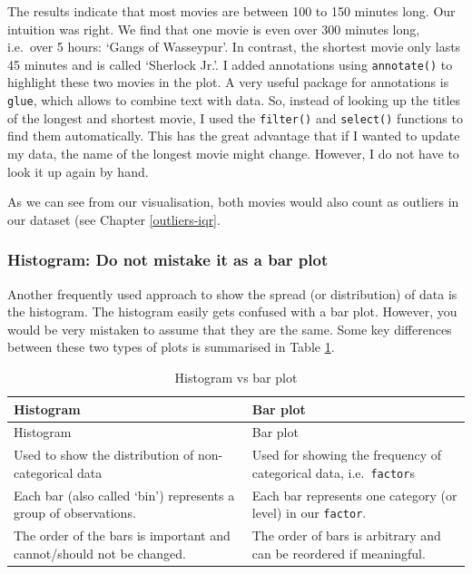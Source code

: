 \documentclass[
]{book}
\begin{document}
The results indicate that most movies are between 100 to 150 minutes long. Our intuition was right. We find that one movie is even over 300 minutes long, i.e.~over 5 hours: `Gangs of Wasseypur'. In contrast, the shortest movie only lasts 45 minutes and is called `Sherlock Jr.'. I added annotations using \texttt{annotate()} to highlight these two movies in the plot. A very useful package for annotations is \texttt{glue}, which allows to combine text with data. So, instead of looking up the titles of the longest and shortest movie, I used the \texttt{filter()} and \texttt{select()} functions to find them automatically. This has the great advantage that if I wanted to update my data, the name of the longest movie might change. However, I do not have to look it up again by hand.

As we can see from our visualisation, both movies would also count as outliers in our dataset (see Chapter \ref{outliers-iqr}.

\hypertarget{histogram-do-not-mistake-it-as-a-bar-plot}{%
\subsubsection{Histogram: Do not mistake it as a bar plot}\label{histogram-do-not-mistake-it-as-a-bar-plot}}

Another frequently used approach to show the spread (or distribution) of data is the histogram. The histogram easily gets confused with a bar plot. However, you would be very mistaken to assume that they are the same. Some key differences between these two types of plots is summarised in Table \ref{tab:histogram-vs-bar-plot}.

\begin{longtable}[]{@{}
  >{\raggedright\arraybackslash}p{}
  >{\raggedright\arraybackslash}p{}@{}}
\caption{\label{tab:histogram-vs-bar-plot} Histogram vs bar plot}\tabularnewline
\toprule
Histogram & Bar plot \\
\midrule
\endfirsthead
\toprule
Histogram & Bar plot \\
\midrule
\endhead
Used to show the distribution of non-categorical data & Used for showing the frequency of categorical data, i.e.~\texttt{factor}s \\
Each bar (also called `bin') represents a group of observations. & Each bar represents one category (or level) in our \texttt{factor}. \\
The order of the bars is important and cannot/should not be changed. & The order of bars is arbitrary and can be reordered if meaningful. \\
\bottomrule
\end{longtable}
\end{document}
